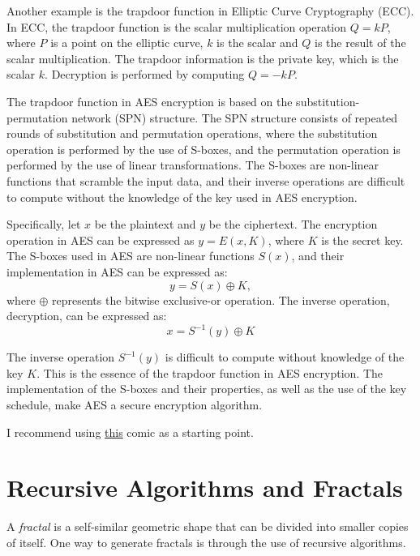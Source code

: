\documentclass{article}
\begin{document}
    \vspace{3mm}
    Another example is the trapdoor function in Elliptic Curve Cryptography (ECC). In ECC, the trapdoor function is the scalar multiplication operation $Q = kP$, where $P$ is a point on the elliptic curve, $k$ is the scalar and $Q$ is the result of the scalar multiplication. The trapdoor information is the private key, which is the scalar $k$. Decryption is performed by computing $Q = -kP$.

    \vspace{3mm}
    The trapdoor function in AES encryption is based on the substitution-permutation network (SPN) structure. The SPN structure consists of repeated rounds of substitution and permutation operations, where the substitution operation is performed by the use of S-boxes, and the permutation operation is performed by the use of linear transformations. The S-boxes are non-linear functions that scramble the input data, and their inverse operations are difficult to compute without the knowledge of the key used in AES encryption.
    
    \vspace{3mm}
    Specifically, let $x$ be the plaintext and $y$ be the ciphertext. The encryption operation in AES can be expressed as $y = E(x, K)$, where $K$ is the secret key. The S-boxes used in AES are non-linear functions $S(x)$, and their implementation in AES can be expressed as: $$y = S(x) \oplus K,$$ where $\oplus$ represents the bitwise exclusive-or operation. The inverse operation, decryption, can be expressed as:$$x = S^{-1}(y) \oplus K$$

    \vspace{3mm}
    The inverse operation $S^{-1}(y)$ is difficult to compute without knowledge of the key $K$. This is the essence of the trapdoor function in AES encryption. The implementation of the S-boxes and their properties, as well as the use of the key schedule, make AES a secure encryption algorithm.

    \vspace{3mm}
    I recommend using \href{http://www.moserware.com/2009/09/stick-figure-guide-to-advanced.html}{this} comic as a starting point.

\pagebreak

\section{Recursive Algorithms and Fractals}
    A \textit{fractal} is a self-similar geometric shape that can be divided into smaller copies of itself. One way to generate fractals is through the use of recursive algorithms.
    
\end{document}
